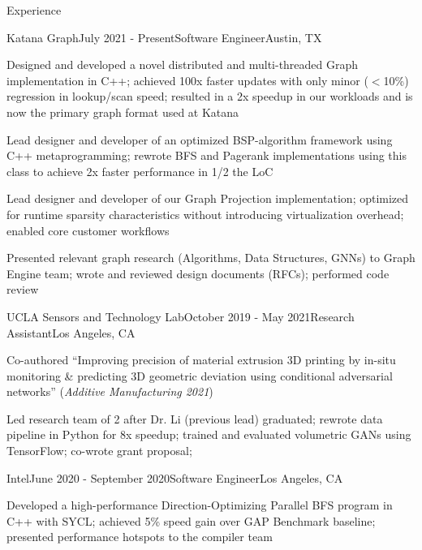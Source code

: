 \documentclass[ 10.5pt ]{resume}
\begin{document}
\begin{rSection}{Experience}

	\begin{rSubsection}{Katana Graph}{July 2021 - Present}{Software Engineer}{Austin, TX}
		\item Designed and developed a novel distributed and multi-threaded Graph implementation in C++; achieved 100x faster updates with only minor ($<$10\%) regression in lookup/scan speed; resulted in a 2x speedup in our workloads and is now the primary graph format used at Katana
		\item Lead designer and developer of an optimized BSP-algorithm framework using C++ metaprogramming; rewrote BFS and Pagerank implementations using this class to achieve 2x faster performance in 1/2 the LoC
		\item Lead designer and developer of our Graph Projection implementation; optimized for runtime sparsity characteristics without introducing virtualization overhead; enabled core customer workflows
		\item Presented relevant graph research (Algorithms, Data Structures, GNNs) to Graph Engine team; wrote and reviewed design documents (RFCs); performed code review
	\end{rSubsection}


	\begin{rSubsection}{UCLA Sensors and Technology Lab}{October 2019 - May 2021}{Research Assistant}{Los Angeles, CA}
		\item Co-authored “Improving precision of material extrusion 3D printing by in-situ monitoring \& predicting 3D geometric deviation using conditional adversarial networks” (\textit{Additive Manufacturing 2021})
		\item Led research team of 2 after Dr. Li (previous lead) graduated; rewrote data pipeline in Python for 8x speedup; trained and evaluated volumetric GANs using TensorFlow; co-wrote grant proposal;
	\end{rSubsection}


	\begin{rSubsection}{Intel}{June 2020 - September 2020}{Software Engineer}{Los Angeles, CA}
		\item Developed a high-performance Direction-Optimizing Parallel BFS program in C++ with SYCL; achieved 5\% speed gain over GAP Benchmark baseline; presented performance hotspots to the compiler team
	\end{rSubsection}

\end{rSection}
\end{document}
